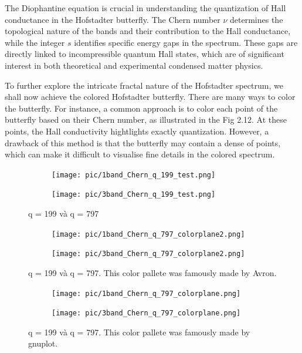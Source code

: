 \documentclass{report}
\begin{document}
The Diophantine equation is crucial in understanding the quantization of Hall conductance in the Hofstadter butterfly. The Chern number $\nu$ determines the topological nature of the bands and their contribution to the Hall conductance, while the integer $s$ identifies specific energy gaps in the spectrum. These gaps are directly linked to incompressible quantum Hall states, which are of significant interest in both theoretical and experimental condensed matter physics.

To further explore the intricate fractal nature of the Hofstadter spectrum, we shall now achieve the colored Hofstadter butterfly. There are many ways to color the butterfly. For instance, a common approach is to color each point of the butterfly based on their Chern number, as illustrated in the Fig 2.12. At these points, the Hall conductivity hightlights exactly quantization. However, a drawback of this method is that the butterfly may contain a dense of points, which can make it difficult to visualise fine details in the colored spectrum. 
\begin{figure}[htb]
	\centering
	\begin{subfigure}[b]{0.495\textwidth}
		\centering
		{\texttt{[image: pic/1band\_Chern\_q\_199\_test.png]}}
	\end{subfigure}
	\begin{subfigure}[b]{0.495\textwidth}
		\centering
		\texttt{[image: pic/3band\_Chern\_q\_199\_test.png]}
	\end{subfigure}
	\caption{
		q = 199 và q = 797
	}
\end{figure}



\begin{figure}[htb]
	\centering
	\begin{subfigure}[b]{0.495\textwidth}
		\centering
		\texttt{[image: pic/1band\_Chern\_q\_797\_colorplane2.png]}
	\end{subfigure}
	\begin{subfigure}[b]{0.495\textwidth}
		\centering
		\texttt{[image: pic/3band\_Chern\_q\_797\_colorplane2.png]}
	\end{subfigure}
	\caption[Colorplaned Hofstadter butterfly.]{
		q = 199 và q = 797. This color pallete was famously made by Avron\cite{avron2003}.
	}
\end{figure}
\begin{figure}[htb]
	\centering
	\begin{subfigure}[b]{0.495\textwidth}
		\centering
		\texttt{[image: pic/1band\_Chern\_q\_797\_colorplane.png]}
	\end{subfigure}
	\begin{subfigure}[b]{0.495\textwidth}
		\centering
		\texttt{[image: pic/3band\_Chern\_q\_797\_colorplane.png]}
	\end{subfigure}
	\caption[Colorplaned Hofstadter butterfly.]{
		q = 199 và q = 797. This color pallete was famously made by gnuplot.
	}
\end{figure}
\end{document}
